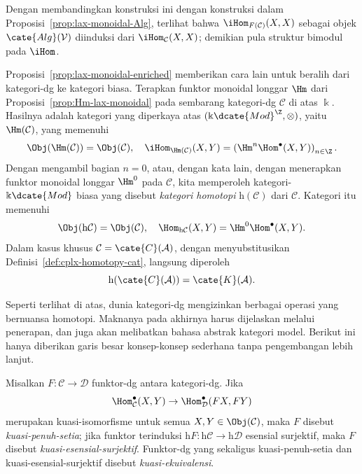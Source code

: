 Dengan membandingkan konstruksi ini dengan konstruksi dalam
Proposisi~\ref{prop:lax-monoidal-Alg}, terlihat bahwa
$\iHom_{F(\mathcal{C})}(X,X)$ sebagai objek $\cate{Alg}(\mathcal{V})$
diinduksi dari $\iHom_{\mathcal{C}}(X,X)$; demikian pula struktur bimodul
pada $\iHom$.

\begin{remark}\label{rem:dg-homotopy-cat}
	Proposisi~\ref{prop:lax-monoidal-enriched} memberikan cara lain untuk
	beralih dari kategori-dg ke kategori biasa. Terapkan funktor monoidal
	longgar $\Hm$ dari Proposisi~\ref{prop:Hm-lax-monoidal} pada sembarang
	kategori-dg $\mathcal{C}$ di atas $\Bbbk$. Hasilnya adalah kategori yang
	diperkaya atas $(\Bbbk\dcate{Mod}^{\Z},\otimes)$, yaitu
	$\Hm(\mathcal{C})$, yang memenuhi
	\[ \Obj(\Hm(\mathcal{C})) = \Obj(\mathcal{C}), \quad \iHom_{\Hm(\mathcal{C})}(X, Y) = \left( \Hm^n \Hom^\bullet(X, Y) \right)_{n \in \Z}. \]
	Dengan mengambil bagian $n=0$, atau, dengan kata lain, dengan menerapkan
	funktor monoidal longgar $\Hm^0$ pada $\mathcal{C}$, kita memperoleh
	kategori-$\Bbbk\dcate{Mod}$ biasa yang disebut \emph{kategori homotopi}
	$\mathrm{h}(\mathcal{C})$ dari $\mathcal{C}$. Kategori itu memenuhi
	\[ \Obj(\mathrm{h}\mathcal{C}) = \Obj(\mathcal{C}), \quad \Hom_{\mathrm{h}\mathcal{C}}(X, Y) = \Hm^0 \Hom^\bullet(X, Y). \]
	Dalam kasus khusus $\mathcal{C}=\cate{C}(\mathcal{A})$, dengan
	menyubstitusikan Definisi~\ref{def:cplx-homotopy-cat}, langsung diperoleh
	\[ \mathrm{h}(\cate{C}(\mathcal{A})) = \cate{K}(\mathcal{A}). \]
\end{remark}

Seperti terlihat di atas, dunia kategori-dg mengizinkan berbagai operasi
yang bernuansa homotopi. Maknanya pada akhirnya harus dijelaskan melalui
penerapan, dan juga akan melibatkan bahasa abstrak kategori model. Berikut
ini hanya diberikan garis besar konsep-konsep sederhana tanpa pengembangan
lebih lanjut.

\begin{definition}
	Misalkan $F:\mathcal{C}\to\mathcal{D}$ funktor-dg antara kategori-dg. Jika
	\[ \Hom^\bullet_{\mathcal{C}}(X, Y) \to \Hom^\bullet_{\mathcal{D}}(FX, FY) \]
	merupakan kuasi-isomorfisme untuk semua
	$X,Y\in\Obj(\mathcal{C})$, maka $F$ disebut \emph{kuasi-penuh-setia}; jika
	funktor terinduksi
	$\mathrm{h}F:\mathrm{h}\mathcal{C}\to\mathrm{h}\mathcal{D}$ esensial
	surjektif, maka $F$ disebut \emph{kuasi-esensial-surjektif}. Funktor-dg
	yang sekaligus kuasi-penuh-setia dan kuasi-esensial-surjektif disebut
	\emph{kuasi-ekuivalensi}.
\end{definition}

